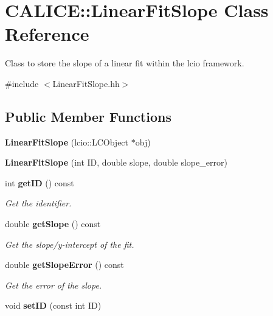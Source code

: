 \section{CALICE::LinearFitSlope Class Reference}
\label{classCALICE_1_1LinearFitSlope}


Class to store the slope of a linear fit within the lcio framework.  


{\ttfamily \#include $<$LinearFitSlope.hh$>$}\subsection*{Public Member Functions}
\begin{DoxyCompactItemize}
\item 
{\bfseries LinearFitSlope} (lcio::LCObject $\ast$obj)\label{classCALICE_1_1LinearFitSlope_a56c966d126341015453783e858b5afda}

\item 
{\bfseries LinearFitSlope} (int ID, double slope, double slope\_\-error)\label{classCALICE_1_1LinearFitSlope_a4d769bd2d4bc5bd2d7cc7136f04092da}

\item 
int {\bf getID} () const \label{classCALICE_1_1LinearFitSlope_af64381cf56c2cae77c77d4a476638197}

\begin{DoxyCompactList}\small\item\em Get the identifier. \item\end{DoxyCompactList}\item 
double {\bf getSlope} () const 
\begin{DoxyCompactList}\small\item\em Get the slope/y-\/intercept of the fit. \item\end{DoxyCompactList}\item 
double {\bf getSlopeError} () const \label{classCALICE_1_1LinearFitSlope_aab0ecd9b3ecff1110159c335e4efd3c2}

\begin{DoxyCompactList}\small\item\em Get the error of the slope. \item\end{DoxyCompactList}\item 
void {\bf setID} (const int ID)\label{classCALICE_1_1LinearFitSlope_ad6db15cec37ac81794b4ac73c8c4894d}


\end{DoxyCompactItemize}
